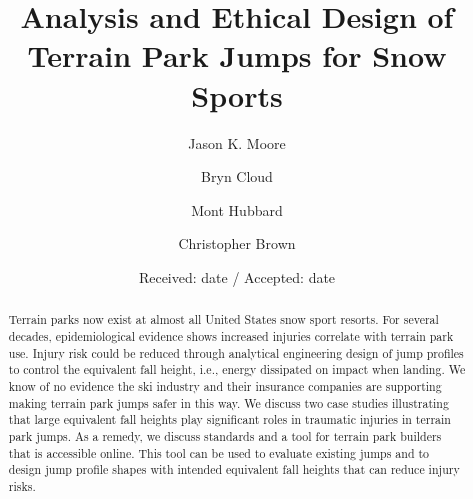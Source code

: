 \documentclass[smallextended]{svjour3}       %
\begin{document}
\title{Analysis and Ethical Design of Terrain Park Jumps for Snow Sports}

\author{Jason K. Moore      \and
        Bryn Cloud          \and
        Mont Hubbard        \and
        Christopher Brown
}



\date{Received: date / Accepted: date}

\maketitle

\begin{abstract}
  Terrain parks now exist at almost all United States snow sport resorts. For
  several decades, epidemiological evidence shows increased injuries correlate
  with terrain park use. Injury risk could be reduced through analytical
  engineering design of jump profiles to control the equivalent fall height,
  i.e., energy dissipated on impact when landing. We know of no evidence the
  ski industry and their insurance companies are supporting making terrain park
  jumps safer in this way. We discuss two case studies illustrating that large
  equivalent fall heights play significant roles in traumatic injuries in
  terrain park jumps. As a remedy, we discuss standards and a tool for
  terrain park builders that is accessible online. This tool can be used to evaluate existing jumps and to design jump profile shapes with intended equivalent fall heights that can reduce injury risks.
\end{abstract}
\end{document}
